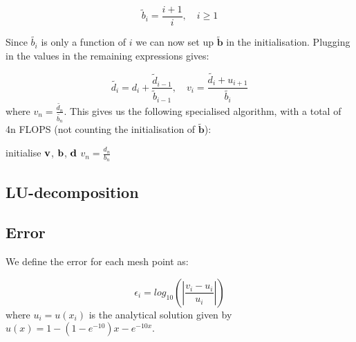 	\begin{equation}
	\widetilde{b}_i = \frac{i+1}{i}, \quad i \geq 1 
	\end{equation}

Since $\widetilde{b_i}$ is only a function of $i$ we can now set up $\mathbf{\widetilde{b}}$ in the initialisation. Plugging in the values in the remaining expressions gives:

	\begin{equation}
	\widetilde{d_i} = d_i + \frac{\widetilde{d}_{i-1}}{\widetilde{b}_{i-1}}, \quad
	v_i = \frac{\widetilde{d_i}+u_{i+1}}{\widetilde{b_i}}
	\end{equation}
where $v_n = \frac{\widetilde{d_n}}{\widetilde{b_n}}$. This gives us the following specialised algorithm, with a total of 4n FLOPS (not counting the initialisation of $\mathbf{\widetilde{b}}$):
	
	\begin{algorithm}[h!]
	\SetAlgoLined
	initialise $\vb{v}$, $\vb{b}$, $\vb{d}$\;
	$v_n = \frac{d_n}{b_n}$\;
	\end{algorithm}



\subsection{LU-decomposition}
\label{sec:LU}

\subsection{Error}
\label{sec:error}

We define the error for each mesh point as:

	\begin{equation}
	\epsilon_i=log_{10}\left(\left|\frac{v_i-u_i}{u_i}\right|\right)
	\end{equation}
where $u_i=u(x_i)$ is the analytical solution given by $u(x) = 1-(1-e^{-10})x-e^{-10x}$. 
